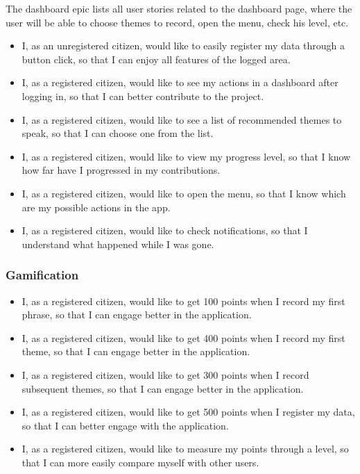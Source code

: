 The dashboard epic lists all user stories related to the dashboard page, where the user will be able to choose themes to record, open the menu, check his level, etc.

\begin{itemize}
    \item I, as an unregistered citizen, would like to easily register my data through a button click, so that I can enjoy all features of the logged area.
    \item I, as a registered citizen, would like to see my actions in a dashboard after logging in, so that I can better contribute to the project.
    \item I, as a registered citizen, would like to see a list of recommended themes to speak, so that I can choose one from the list.
    \item I, as a registered citizen, would like to view my progress level, so that I know how far have I progressed in my contributions.
    \item I, as a registered citizen, would like to open the menu, so that I know which are my possible actions in the app.
    \item I, as a registered citizen, would like to check notifications, so that I understand what happened while I was gone.
\end{itemize}

\subsubsection{Gamification}

\begin{itemize}
    \item I, as a registered citizen, would like to get 100 points when I record my first phrase, so that I can engage better in the application.
    \item I, as a registered citizen, would like to get 400 points when I record my first theme, so that I can engage better in the application.
    \item I, as a registered citizen, would like to get 300 points when I record subsequent themes, so that I can engage better in the application.
    \item I, as a registered citizen, would like to get 500 points when I register my data, so that I can better engage with the application.
    \item I, as a registered citizen, would like to measure my points through a level, so that I can more easily compare myself with other users.
\end{itemize}

